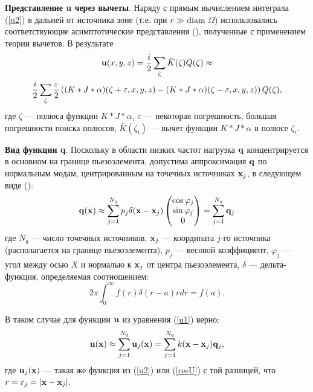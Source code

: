 \documentclass[a4paper, 12pt]{article}
\begin{document}
{\bf Представление u через вычеты}. Наряду с прямым вычислением интеграла (\ref{u2}) в дальней от источника зоне
(т.е. при $r \gg \text{diam } \Omega$) использовались соответствующие асимптотические представления
(\cite{g89}), полученные с применением теории вычетов. В результате
\begin{multline}
    {\bf u}(x,y,z)=\frac{i}{2} \sum_{\zeta} \bar{K}(\zeta) Q(\zeta) \approx \\
    \frac{i}{2} \sum_{\zeta} \frac{\varepsilon}{2} \left( (K*J*\alpha)(\zeta+\varepsilon,x,y,z)-(K*J*\alpha)(\zeta-\varepsilon,x,y,z) \right)  Q(\zeta),
\label{resU}
\end{multline}
где $\zeta$ --- полюса функции $K*J*\alpha$, $\varepsilon$ --- некоторая погрешность, большая погрешности поиска полюсов,
$\bar{K}(\zeta_i)$ --- вычет функции $K*J*\alpha$ в полюсе $\zeta_i$.

{\bf Вид функции q}. Поскольку в области низких частот нагрузка ${\bf q}$ концентрируется в основном на границе пьезоэлемента,
допустима аппроксимация ${\bf q}$ по нормальным модам, центрированным на точечных источниках ${\bf x}_j$, в следующем виде (\cite{eng}):
\begin{equation}
    {\bf q}({\bf x}) \approx \sum_{j=1}^{N_q} p_j \delta({\bf x}-{\bf x}_j)
    \begin{pmatrix}
        \cos \varphi_j\\
        \sin \varphi_j\\
        0
    \end{pmatrix}=
    \sum_{j=1}^{N_q} {\bf q}_j
\end{equation}
где $N_q$ --- число точечных источников, ${\bf x}_j$ --- координата $j$-го источника (располагается на границе пьезоэлемента), $p_j$ --- весовой коэффициент,
$\varphi_j$ --- угол между осью $X$ и нормалью к ${\bf x}_j$ от центра пьезоэлемента,
$\delta$ --- дельта-функция, определяемая соотношением:
\begin{equation*}
    2 \pi \int_0^{\infty} f(r) \delta(r-a) r dr =f(a).
\end{equation*}

В таком случае для функции ${\bf u}$ из уравнения (\ref{u1}) верно:
\begin{equation}
    {\bf u}({\bf x}) \approx \sum_{j=1}^{N_q} {\bf u}_j({\bf x})=\sum_{j=1}^{N_q} k({\bf x}-{\bf x}_j) {\bf q}_j,
\end{equation}
где ${\bf u}_j({\bf x})$ --- такая же функция из (\ref{u2}) или (\ref{resU}) с той разницей, что $r=r_j=|{\bf x} -{\bf x}_j|$.
\end{document}
